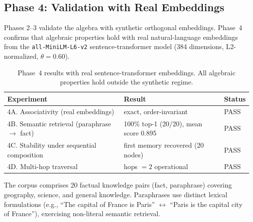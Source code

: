 \documentclass[11pt,a4paper]{article}
\theoremstyle{definition}
\begin{document}
\subsection{Phase 4: Validation with Real Embeddings}

Phases 2--3 validate the algebra with synthetic orthogonal embeddings. Phase~4 confirms that algebraic properties hold with real natural-language embeddings from the \texttt{all-MiniLM-L6-v2} sentence-transformer model (384 dimensions, L2-normalized, $\theta = 0.60$).

\begin{table}[h]
\centering
\begin{tabular}{lll}
\toprule
\textbf{Experiment} & \textbf{Result} & \textbf{Status} \\
\midrule
4A. Associativity (real embeddings) & exact, order-invariant & PASS \\
4B. Semantic retrieval (paraphrase $\to$ fact) & 100\% top-1 (20/20), mean score 0.895 & PASS \\
4C. Stability under sequential composition & first memory recovered (20 nodes) & PASS \\
4D. Multi-hop traversal & hops $= 2$ operational & PASS \\
\bottomrule
\end{tabular}
\caption{Phase~4 results with real sentence-transformer embeddings. All algebraic properties hold outside the synthetic regime.}
\end{table}

The corpus comprises 20 factual knowledge pairs (fact, paraphrase) covering geography, science, and general knowledge. Paraphrases use distinct lexical formulations (e.g., ``The capital of France is Paris'' $\leftrightarrow$ ``Paris is the capital city of France''), exercising non-literal semantic retrieval.
\end{document}
